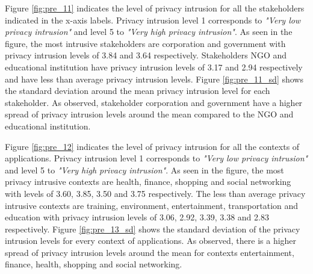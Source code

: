 Figure \ref{fig:pre_11} indicates the level of privacy intrusion for all the stakeholders indicated in the x-axis labels. Privacy intrusion level 1 corresponds to \textit{"Very low privacy intrusion"} and level 5 to \textit{"Very high privacy intrusion"}. As seen in the figure, the most intrusive stakeholders are corporation and government with privacy intrusion levels of 3.84 and 3.64 respectively. Stakeholders NGO and educational institution have privacy intrusion levels of 3.17 and 2.94 respectively and have less than average privacy intrusion levels. Figure \ref{fig:pre_11_sd} shows the standard deviation around the mean privacy intrusion level for each stakeholder. As observed, stakeholder corporation and government have a higher spread of privacy intrusion levels around the mean compared to the NGO and educational institution.

Figure \ref{fig:pre_12} indicates the level of privacy intrusion for all the contexts of applications.  Privacy intrusion level 1 corresponds to \textit{"Very low privacy intrusion"} and level 5 to \textit{"Very high privacy intrusion"}. As seen in the figure, the most privacy intrusive contexts are health, finance, shopping and social networking with levels of 3.60, 3.85, 3.50 and 3.75 respectively. The less than average privacy intrusive contexts are training, environment, entertainment, transportation and education with privacy intrusion levels of 3.06, 2.92, 3.39, 3.38 and 2.83 respectively. Figure \ref{fig:pre_13_sd} shows the standard deviation of the privacy intrusion levels for every context of applications. As observed, there is a higher spread of privacy intrusion levels around the mean for contexts entertainment, finance, health, shopping and social networking.



%

%



